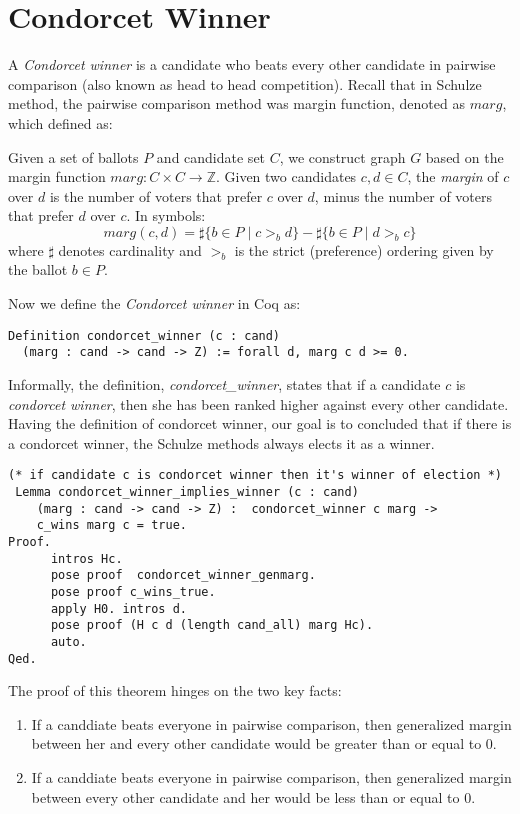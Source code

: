 \section{Condorcet Winner}
	A \textit{Condorcet winner} is a candidate who beats every other candidate in pairwise comparison (also known as head to head competition). 
	Recall that in Schulze method, the pairwise comparison method was margin function, denoted as $marg$, which defined as:
	\begin{displayquote}
	Given a set of ballots $P$ and candidate set $C$, we construct graph $G$ based on the margin function $marg: C \times C \to \mathbb{Z}$. Given two candidates $c, d \in C$,
the \emph{margin} of $c$ over $d$ is
the number of voters that prefer $c$ over $d$, minus the number of voters that prefer $d$ over $c$. 
In symbols:
\[
  marg(c, d) = \sharp \lbrace b \in P \mid c >_b d \rbrace -
            \sharp \lbrace b \in P \mid d >_b c \rbrace
\] where $\sharp$ denotes cardinality and $>_b$ is the strict
(preference) ordering given by the ballot $b \in P$.
 
 \end{displayquote}
  
	 
  Now we define the \textit{Condorcet winner} in Coq as:
 \begin{verbatim}
Definition condorcet_winner (c : cand) 
  (marg : cand -> cand -> Z) := forall d, marg c d >= 0.
\end{verbatim}

  Informally, the definition, \textit{condorcet\_winner}, states that 
  if a candidate $c$  is \textit{condorcet winner}, then she has been ranked higher against
  every other candidate.  Having the definition of  condorcet winner, our goal is to concluded that if there is 
 	a condorcet winner, the Schulze methods always elects it as a winner.  
 	
\begin{verbatim}
(* if candidate c is condorcet winner then it's winner of election *)
 Lemma condorcet_winner_implies_winner (c : cand) 
    (marg : cand -> cand -> Z) :  condorcet_winner c marg ->
    c_wins marg c = true. 
Proof.
      intros Hc. 
      pose proof  condorcet_winner_genmarg.
      pose proof c_wins_true.
      apply H0. intros d.
      pose proof (H c d (length cand_all) marg Hc).
      auto.
Qed.
\end{verbatim}
 		
 The proof of this theorem hinges on the two key facts:
 \begin{enumerate}
  \item If a canddiate beats everyone in pairwise comparison, then generalized margin between her and every other candidate would 
      be  greater than or equal to 0.
  \item If a canddiate beats everyone in pairwise comparison, then generalized margin between every other candidate and her would 
      be  less than or equal to 0.
 \end{enumerate}
 
